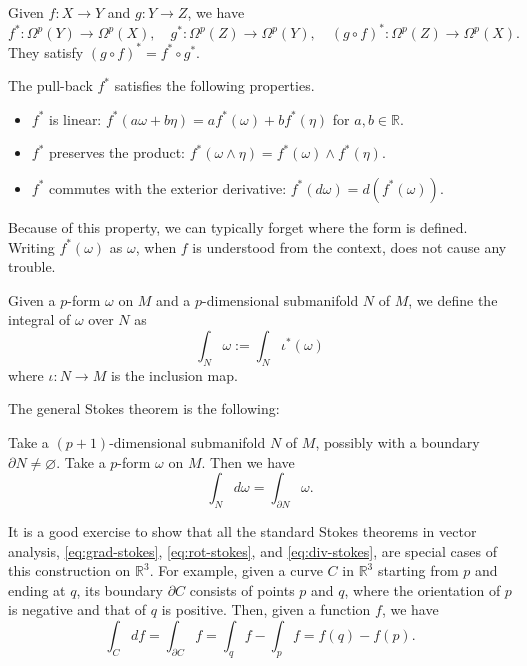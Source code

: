 \documentclass[12pt]{article}
\numberwithin{equation}{section}
\numberwithin{figure}{section}
\theoremstyle{remark}
\def\bR{\mathbb{R}}
\begin{document}
\begin{proposition}
  Given $f:X\to Y$ and $g:Y\to Z$,
  we have \begin{equation}
  f^*: \Omega^p(Y)\to \Omega^p(X),\quad
  g^*: \Omega^p(Z)\to \Omega^p(Y),\quad
  (g\circ f)^* : \Omega^p(Z)\to \Omega^p(X).
  \end{equation}
  They satisfy $(g\circ f)^* = f^*\circ g^*$.
\end{proposition}

\begin{proposition}
The pull-back $f^*$ satisfies the following properties.
\begin{itemize}
\item $f^*$ is linear: $f^*(a\omega + b\eta) = a f^*(\omega) + b f^*(\eta)$ for $a,b\in \bR$.
\item $f^*$ preserves the product: $f^*(\omega\wedge \eta) = f^*(\omega)\wedge f^*(\eta)$.
\item $f^*$ commutes with the exterior derivative: $f^*(d\omega) = d(f^*(\omega))$.
\end{itemize}
\end{proposition}

Because of this property, we can typically forget where the form is defined.
Writing $f^*(\omega)$ as $\omega$, when $f$ is understood from the context,
does not cause any trouble.

\begin{definition}
Given a $p$-form $\omega$ on $M$ and a $p$-dimensional submanifold $N$ of $M$,
we define the integral of $\omega$ over $N$ as \begin{equation}
\int_N \omega := \int_N \iota^*(\omega)
\end{equation}
where $\iota:N\to M$ is the inclusion map.
\end{definition}

The general Stokes theorem is the following:
\begin{proposition}
Take a $(p+1)$-dimensional submanifold $N$ of $M$, possibly with a boundary $\partial N\neq \varnothing$.
Take a $p$-form $\omega$ on $M$.
Then we have \begin{equation}
\int_N d\omega = \int_{\partial N} \omega.
\end{equation}
\end{proposition}
It is a good exercise to show that all the standard Stokes theorems in vector analysis, \eqref{eq:grad-stokes}, \eqref{eq:rot-stokes}, and \eqref{eq:div-stokes}, 
are special cases of this construction on $\bR^3$.
For example, given a curve $C$ in $\bR^3$ starting from $p$ and ending at $q$,
its boundary $\partial C$ consists of points $p$ and $q$,
where the orientation of $p$ is negative and that of $q$ is positive.
Then, given a function $f$, we have \begin{equation}
\int_C df = \int_{\partial C} f = \int_q f - \int_p f = f(q)-f(p).
\end{equation}
\end{document}
